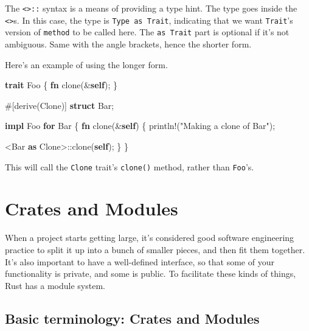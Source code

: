 \documentclass[a4paper,]{book}
\newenvironment{Shaded}{\begin{snugshade}}{\end{snugshade}}
\newcommand{\KeywordTok}[1]{\textcolor[rgb]{0.13,0.29,0.53}{\textbf{{#1}}}}
\newcommand{\StringTok}[1]{\textcolor[rgb]{0.31,0.60,0.02}{{#1}}}
\newcommand{\OtherTok}[1]{\textcolor[rgb]{0.56,0.35,0.01}{{#1}}}
\newcommand{\NormalTok}[1]{{#1}}
\begin{document}
The \texttt{\textless{}\textgreater{}::} syntax is a means of providing
a type hint. The type goes inside the
\texttt{\textless{}\textgreater{}}s. In this case, the type is
\texttt{Type\ as\ Trait}, indicating that we want \texttt{Trait}'s
version of \texttt{method} to be called here. The \texttt{as\ Trait}
part is optional if it's not ambiguous. Same with the angle brackets,
hence the shorter form.

Here's an example of using the longer form.

\begin{Shaded}
\begin{Highlighting}[]
\KeywordTok{trait} \NormalTok{Foo \{}
    \KeywordTok{fn} \NormalTok{clone(&}\KeywordTok{self}\NormalTok{);}
\NormalTok{\}}

\OtherTok{#[}\NormalTok{derive}\OtherTok{(}\NormalTok{Clone}\OtherTok{)]}
\KeywordTok{struct} \NormalTok{Bar;}

\KeywordTok{impl} \NormalTok{Foo }\KeywordTok{for} \NormalTok{Bar \{}
    \KeywordTok{fn} \NormalTok{clone(&}\KeywordTok{self}\NormalTok{) \{}
        \OtherTok{println!}\NormalTok{(}\StringTok{"Making a clone of Bar"}\NormalTok{);}

        \NormalTok{<Bar }\KeywordTok{as} \NormalTok{Clone>::clone(}\KeywordTok{self}\NormalTok{);}
    \NormalTok{\}}
\NormalTok{\}}
\end{Highlighting}
\end{Shaded}

This will call the \texttt{Clone} trait's \texttt{clone()} method,
rather than \texttt{Foo}'s.

\section{Crates and Modules}\label{sec--crates-and-modules}

When a project starts getting large, it's considered good software
engineering practice to split it up into a bunch of smaller pieces, and
then fit them together. It's also important to have a well-defined
interface, so that some of your functionality is private, and some is
public. To facilitate these kinds of things, Rust has a module system.

\subsection{Basic terminology: Crates and
Modules}\label{basic-terminology-crates-and-modules}
\end{document}
